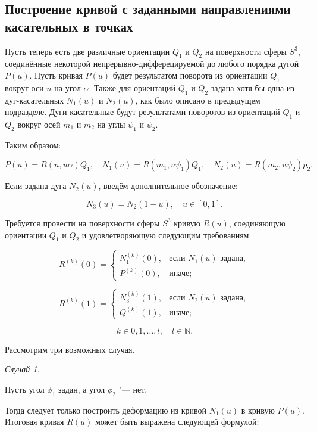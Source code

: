 \subsection*{Построение кривой с заданными направлениями \mbox{касательных} в точках}

Пусть теперь есть две различные ориентации $Q_1$ и $Q_2$ на поверхности сферы $S^3$, соединённые некоторой
непрерывно-дифферецируемой до любого порядка дугой $P(u)$. Пусть кривая $P(u)$ будет результатом поворота из
ориентации $Q_1$ вокруг оси $n$ на угол $\alpha$. Также для ориентаций $Q_1$ и $Q_2$ задана хотя бы одна из
дуг-касательных $N_1(u)$ и $N_2(u)$, как было описано в предыдущем подразделе. Дуги-касательные будут результатами
поворотов из ориентаций $Q_1$ и $Q_2$ вокруг осей $m_1$ и $m_2$ на углы $\psi_1$ и $\psi_2$.

Таким образом:

$$
P(u)=R(n,u\alpha)Q_1, \quad N_1(u)=R(m_1,u\psi_1)Q_1, \quad N_2(u)=R(m_2,u\psi_2)p_2.
$$

Если задана дуга $N_2(u)$, введём дополнительное обозначение:

$$
N_3(u)=N_2(1-u), \quad u \in [0,1].
$$

Требуется провести на поверхности сферы $S^3$ кривую $R(u)$, соединяющую ориентации $Q_1$ и $Q_2$ и удовлетворяющую
следующим требованиям:

\begin{equation*}
R^{(k)}(0)=
  \begin{cases}
    N_1^{(k)}(0), & \text{если $N_1(u)$ задана}, \\
    P^{(k)}(0),   & \text{иначе};
  \end{cases}
\end{equation*}

\begin{equation*}
R^{(k)}(1)=
  \begin{cases}
    N_3^{(k)}(1), & \text{если $N_2(u)$ задана}, \\
    Q^{(k)}(1),   & \text{иначе};
  \end{cases}
\end{equation*}

$$
k \in {0,1,\dots,l}, \quad l \in \mathbb{N}.
$$

Рассмотрим три возможных случая.

\bigskip
\textit{Случай 1.}

Пусть угол $\phi_1$ задан, а угол $\phi_2$ "--- нет.

Тогда следует только построить деформацию из кривой $N_1(u)$ в кривую $P(u)$. Итоговая кривая $R(u)$ может быть
выражена следующей формулой:

